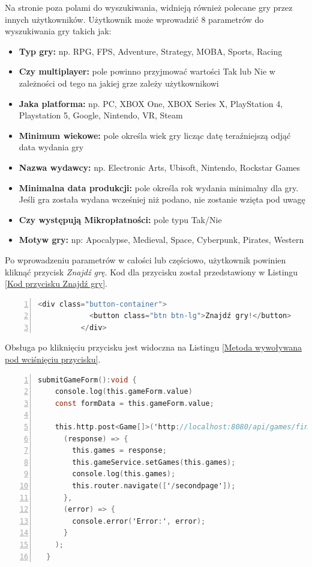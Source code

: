 Na stronie poza polami do wyszukiwania, widnieją również polecane gry przez innych użytkowników. 
Użytkownik może wprowadzić 8 parametrów do wyszukiwania gry takich jak:
\begin{itemize}
\item \textbf{Typ gry:} np. RPG, FPS, Adventure, Strategy, MOBA, Sports, Racing
\item \textbf{Czy multiplayer:} pole powinno przyjmować wartości Tak lub Nie w zależności od tego na jakiej grze zależy użytkownikowi
\item \textbf{Jaka platforma:} np. PC, XBOX One, XBOX Series X, PlayStation 4, Playstation 5, Google, Nintendo, VR, Steam
\item \textbf{Minimum wiekowe:} pole określa wiek gry licząc datę teraźniejszą odjąć data wydania gry
\item \textbf{Nazwa wydawcy:} np. Electronic Arts, Ubisoft, Nintendo, Rockstar Games
\item \textbf{Minimalna data produkcji:} pole określa rok wydania minimalny dla gry. Jeśli gra została wydana wcześniej niż podano, nie zostanie wzięta pod uwagę
\item \textbf{Czy występują Mikropłatności:} pole typu Tak/Nie
\item \textbf{Motyw gry:} np: Apocalypse, Medieval, Space, Cyberpunk, Pirates, Western
\end{itemize}
Po wprowadzeniu parametrów w całości lub częściowo, użytkownik powinien kliknąć przycisk \textit{Znajdź grę}.
Kod dla przycisku został przedstawiony w Listingu \ref{Kod przycisku Znajdź gry}.
\begin{lstlisting}[language=C, mathescape, frame=single, numbers=left, xleftmargin=2em, framexleftmargin=2em, basicstyle=\ttfamily\bfseries, caption={Kod przycisku Znajdź gry}, label={Kod przycisku Znajdź gry}]
          <div class="button-container">
            <button class="btn btn-lg">Znajdź gry!</button>
          </div>
\end{lstlisting}
Obsługa po kliknięciu przycisku jest widoczna na Listingu \ref{Metoda wywoływana pod wciśnięciu przycisku}.
\begin{lstlisting}[language=C, mathescape, frame=single, numbers=left, xleftmargin=2em, framexleftmargin=2em, basicstyle=\ttfamily\bfseries, caption={Metoda wywoływana po wciśnięciu przycisku}, label={Metoda wywoływana po wciśnięciu przycisku}]
  submitGameForm():void {
    console.log(this.gameForm.value)
    const formData = this.gameForm.value;

    this.http.post<Game[]>('http://localhost:8080/api/games/findByCriteria', formData).subscribe(
      (response) => {
        this.games = response;
        this.gameService.setGames(this.games);
        console.log(this.games);
        this.router.navigate(['/secondpage']);
      },
      (error) => {
        console.error('Error:', error);
      }
    );
  }
\end{lstlisting}
